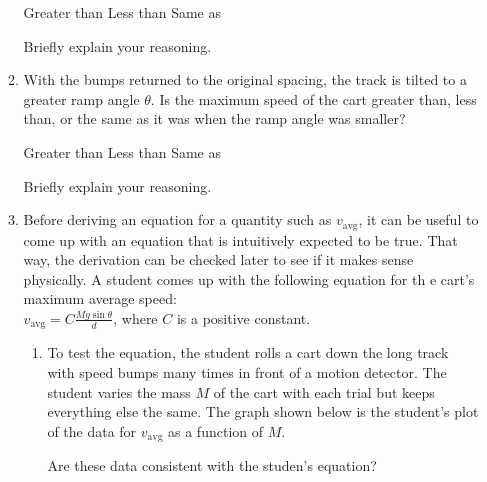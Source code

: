 \documentclass{../../../oss-apphys}
\begin{document}
\begin{enumerate}[leftmargin=15pt]
\begin{enumerate}[noitemsep,topsep=0pt]
    \vspace{.2in}
    \underline{\hspace{.25in}} Greater than\hspace{.5in}
    \underline{\hspace{.25in}} Less than\hspace{.5in}
    \underline{\hspace{.25in}} Same as

    \vspace{.2in}Briefly explain your reasoning.
    \vspace{.4in}
  \item With the bumps returned to the original spacing, the track is tilted to
    a greater ramp angle $\theta$. Is the maximum speed of the cart greater
    than, less than, or the same as it was when the ramp angle was smaller?

    \vspace{.2in}
    \underline{\hspace{.25in}} Greater than\hspace{.5in}
    \underline{\hspace{.25in}} Less than\hspace{.5in}
    \underline{\hspace{.25in}} Same as

    \vspace{.2in}Briefly explain your reasoning.
    \newpage

  \item Before deriving an equation for a quantity such as $v_\mathrm{avg}$, it
    can be useful to come up with an equation that is intuitively expected to
    be true. That way, the derivation can be checked later to see if it makes
    sense physically. A student comes up with the following equation for th
    e cart's maximum average speed:\\
    $\displaystyle v_\mathrm{avg}=C\frac{Mg\sin\theta}{d}$, where $C$ is a
    positive constant.
    \begin{enumerate}[noitemsep,topsep=0pt]
    \item To test the equation, the student rolls a cart down the long track
      with speed bumps many times in front of a motion detector. The student
      varies the mass $M$ of the cart with each trial but keeps everything else
      the same. The graph shown below is the student's plot of the data for
      $v_\mathrm{avg}$ as a function of $M$.
      \begin{center}
      \end{center}
      Are these data consistent with the studen's equation?


\end{enumerate}
\end{enumerate}
\end{enumerate}
\end{document}
